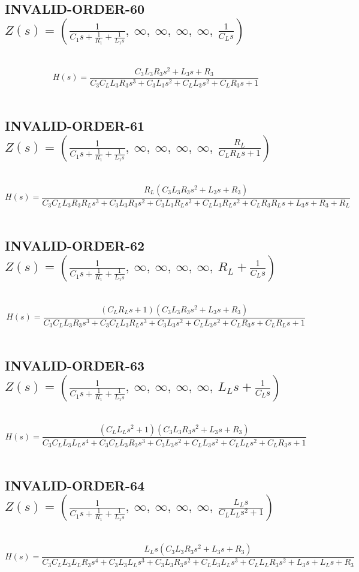 \documentclass{article}
\begin{document}
\subsection{INVALID-ORDER-60 $Z(s) = \left( \frac{1}{C_{1} s + \frac{1}{R_{1}} + \frac{1}{L_{1} s}}, \  \infty, \  \infty, \  \infty, \  \infty, \  \frac{1}{C_{L} s}\right)$ } \ 
\textbf{\[H(s) = \frac{C_{3} L_{3} R_{3} s^{2} + L_{3} s + R_{3}}{C_{3} C_{L} L_{3} R_{3} s^{3} + C_{3} L_{3} s^{2} + C_{L} L_{3} s^{2} + C_{L} R_{3} s + 1}\] } \ 
\subsection{INVALID-ORDER-61 $Z(s) = \left( \frac{1}{C_{1} s + \frac{1}{R_{1}} + \frac{1}{L_{1} s}}, \  \infty, \  \infty, \  \infty, \  \infty, \  \frac{R_{L}}{C_{L} R_{L} s + 1}\right)$ } \ 
\textbf{\[H(s) = \frac{R_{L} \left(C_{3} L_{3} R_{3} s^{2} + L_{3} s + R_{3}\right)}{C_{3} C_{L} L_{3} R_{3} R_{L} s^{3} + C_{3} L_{3} R_{3} s^{2} + C_{3} L_{3} R_{L} s^{2} + C_{L} L_{3} R_{L} s^{2} + C_{L} R_{3} R_{L} s + L_{3} s + R_{3} + R_{L}}\] } \ 
\subsection{INVALID-ORDER-62 $Z(s) = \left( \frac{1}{C_{1} s + \frac{1}{R_{1}} + \frac{1}{L_{1} s}}, \  \infty, \  \infty, \  \infty, \  \infty, \  R_{L} + \frac{1}{C_{L} s}\right)$ } \ 
\textbf{\[H(s) = \frac{\left(C_{L} R_{L} s + 1\right) \left(C_{3} L_{3} R_{3} s^{2} + L_{3} s + R_{3}\right)}{C_{3} C_{L} L_{3} R_{3} s^{3} + C_{3} C_{L} L_{3} R_{L} s^{3} + C_{3} L_{3} s^{2} + C_{L} L_{3} s^{2} + C_{L} R_{3} s + C_{L} R_{L} s + 1}\] } \ 
\subsection{INVALID-ORDER-63 $Z(s) = \left( \frac{1}{C_{1} s + \frac{1}{R_{1}} + \frac{1}{L_{1} s}}, \  \infty, \  \infty, \  \infty, \  \infty, \  L_{L} s + \frac{1}{C_{L} s}\right)$ } \ 
\textbf{\[H(s) = \frac{\left(C_{L} L_{L} s^{2} + 1\right) \left(C_{3} L_{3} R_{3} s^{2} + L_{3} s + R_{3}\right)}{C_{3} C_{L} L_{3} L_{L} s^{4} + C_{3} C_{L} L_{3} R_{3} s^{3} + C_{3} L_{3} s^{2} + C_{L} L_{3} s^{2} + C_{L} L_{L} s^{2} + C_{L} R_{3} s + 1}\] } \ 
\subsection{INVALID-ORDER-64 $Z(s) = \left( \frac{1}{C_{1} s + \frac{1}{R_{1}} + \frac{1}{L_{1} s}}, \  \infty, \  \infty, \  \infty, \  \infty, \  \frac{L_{L} s}{C_{L} L_{L} s^{2} + 1}\right)$ } \ 
\textbf{\[H(s) = \frac{L_{L} s \left(C_{3} L_{3} R_{3} s^{2} + L_{3} s + R_{3}\right)}{C_{3} C_{L} L_{3} L_{L} R_{3} s^{4} + C_{3} L_{3} L_{L} s^{3} + C_{3} L_{3} R_{3} s^{2} + C_{L} L_{3} L_{L} s^{3} + C_{L} L_{L} R_{3} s^{2} + L_{3} s + L_{L} s + R_{3}}\] } \ 
\end{document}
